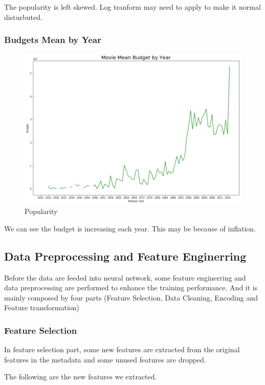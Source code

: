 \documentclass{article}
\begin{document}
The popularity is left skewed. Log tranform may need to apply to make it normal disturbuted.

\subsubsection{Budgets Mean by Year}
\begin{figure}[h]
  \centering
  \includegraphics[scale=0.4]{mean_budget.png}
  \caption{Popularity}
\end{figure}

We can see the budget is increasing each year. This may be because of inflation.


\subsection{Data Preprocessing and Feature Enginerring}

Before the data are feeded into neural network, some feature enginerring and data preprocessing are performed to enhance the training performance. And it is mainly composed by four parts (Feature Selection, Data Cleaning, Encoding and Feature transformation)


\subsubsection{Feature Selection}

	In feature selection part, some new features are extracted from the original features in the metadata and some unused features are dropped. 
	
The following are the new features we extracted.
	
\end{document}
